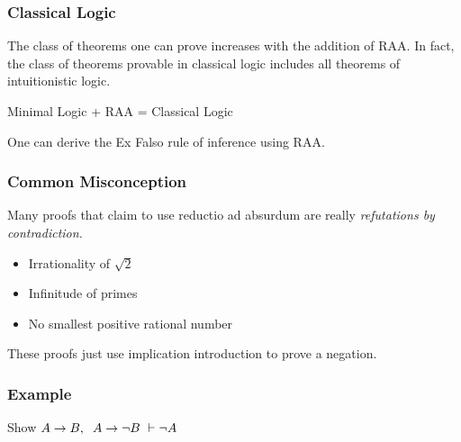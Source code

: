 \documentclass{beamer}
\begin{document}
\begin{frame}
  \frametitle{Classical Logic}

	The class of theorems one can prove increases with the addition of RAA. In fact, the class of theorems provable in classical logic includes all theorems of intuitionistic logic. 

	\begin{center}
  		Minimal Logic + RAA = Classical Logic 	
	\end{center}

	One can derive the Ex Falso rule of inference using RAA. 

	\vspace{4cm}

\end{frame}

\begin{frame}
	\frametitle{Common Misconception}

	Many proofs that claim to use reductio ad absurdum are really \emph{refutations by contradiction.}

	\begin{itemize}
		\item Irrationality of $\sqrt{2}$
		\item Infinitude of primes
		\item No smallest positive rational number
	\end{itemize}

	\vspace{30mm}

	These proofs just use implication introduction to prove a negation. 

\end{frame}

\begin{frame}
	\frametitle{Example}
	Show $A \rightarrow B, \hspace{0.2cm} A \rightarrow \lnot B \ \vdash \lnot A$
	\vspace{7cm}
	
	
	
\end{frame}
\end{document}
